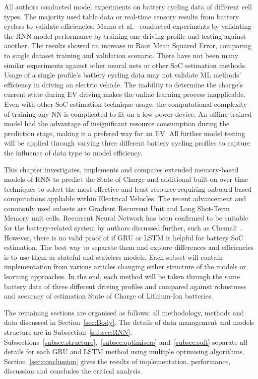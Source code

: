 All authors conducted model experiments on battery cycling data of different cell types.
The majority used table data or real-time sensory results from battery cyclers to validate efficiencies.
Mamo et al.~\cite{mamo_long_2020} conducted experiments by validating the RNN model performance by training one driving profile and testing against another.
The results showed an increase in Root Mean Squared Error, comparing to single dataset training and validation scenario.
There have not been many similar experiments against other neural nets or other SoC estimation methods.
Usage of a single profile's battery cycling data may not validate ML methods' efficiency in driving an electric vehicle.
The inability to determine the charge's current state during EV driving makes the online learning process inapplicable.
Even with other SoC estimation technique usage, the computational complexity of training any NN is complicated to fit on a low power device.
An offline trained model had the advantage of insignificant resource consumption during the prediction stage, making it a prefered way for an EV.
All further model testing will be applied through varying three different battery cycling profiles to capture the influence of data type to model efficiency.

%
%
This chapter investigates, implements and compares extended memory-based models of RNN to predict the State of Charge and additional built-on over time techniques to select the most effective and least resource requiring onboard-based computations appliable within Electrical Vehicles.
The recent advancement and commonly used subsets are Gradient Recurrent Unit and Long Shot-Term Memory unit cells. Recurrent Neural Network has been confirmed to be suitable for the battery-related system by authors discussed further, such as Chemali~\cite{LSTM_Hochreiter1997}.
However, there is no valid proof of if GRU or LSTM is helpful for battery SoC estimation.
The best way to separate them and explore differences and efficiencies is to use them as stateful and stateless models.
Each subset will contain implementation from various articles changing either structure of the models or learning approaches.
In the end, each method will be taken through the same battery data of three different driving profiles and compared against robustness and accuracy of estimation State of Charge of Lithium-Ion batteries.

%
%
The remaining sections are organised as follows: all methodology, methods and data discussed in Section~\ref{sec:Body}.
The details of data management and models structure are in Subsection~\ref{subsec:RNN}.
Subsections~\ref{subsec:structure},~\ref{subsec:optimisers} and~\ref{subsec:soft} separate all details for each GRU and LSTM method using multiple optimising algorithms.
Section~\ref{sec:conclussion} gives the results of implementation, performance, discussion and concludes the critical analysis.